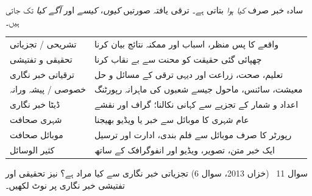 \begin{hal}
سادہ خبر صرف \emph{کیا ہوا} بتاتی ہے۔ ترقی یافتہ صورتیں \emph{کیوں}،
\emph{کیسے} اور \emph{آگے کیا} تک جاتی ہیں۔

\medskip
\begin{center}
\begin{tabular}{@{}p{3.6cm} p{10.8cm}@{}}
\toprule
تشریحی / تجزیاتی & واقعے کا پس منظر، اسباب اور ممکنہ نتائج بیان کرنا \\
تحقیقی و تفتیشی & چھپائی گئی حقیقت کو محنت سے بے نقاب کرنا \\
ترقیاتی خبر نگاری & تعلیم، صحت، زراعت اور دیہی ترقی کے مسائل و حل \\
خصوصی / پیشہ ورانہ & معیشت، سائنس، ماحول جیسے شعبوں کی ماہرانہ رپورٹنگ \\
ڈیٹا خبر نگاری & اعداد و شمار کے تجزیے سے کہانی نکالنا؛ گراف اور نقشے \\
شہری صحافت & عام شہری کا موبائل سے خبر یا ویڈیو بھیجنا \\
موبائل صحافت & رپورٹر کا صرف موبائل سے فلم بندی، ادارت اور ترسیل \\
کثیر الوسائل & ایک خبر متن، تصویر، ویڈیو اور انفوگرافک کے ساتھ \\
\bottomrule
\end{tabular}
\end{center}

\end{hal}

\begin{sawal}{سوال \textenglish{11} \ \textnormal{\small(خزاں \textenglish{2013}، سوال \textenglish{6})}}
تجزیاتی خبر نگاری سے کیا مراد ہے؟ نیز تحقیقی اور تفتیشی خبر نگاری پر نوٹ لکھیں۔
\end{sawal}

